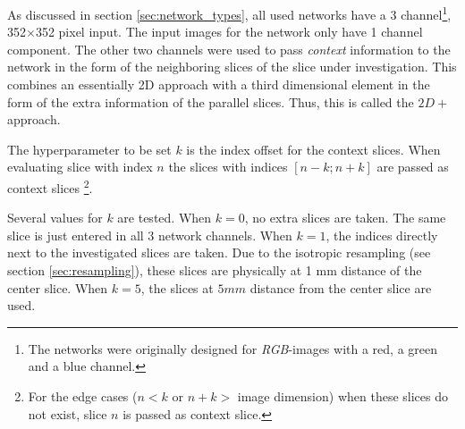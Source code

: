 As discussed in section \ref{sec:network_types}, all used networks have a 3 channel\footnote{The networks were originally designed for \textit{RGB}-images with a red, a green and a blue channel.}, 
352$\times$352 pixel input. 
The input images for the network only have 1 channel component. 
The other two channels were used to pass \textit{context} information to the network in the form of the neighboring slices of the slice under investigation.
This combines an essentially 2D approach with a third dimensional element in the form of the extra information of the parallel slices. Thus, this is called the $2D+$ approach.


The hyperparameter to be set $k$ is the index offset for the context slices.
When evaluating slice with index $n$ the slices with indices $\left[n-k; n+k\right]$ are passed as context slices
\footnote{For the edge cases ($n<k$ or $n+k>$ image dimension) when these slices do not exist, slice $n$ is passed as context slice.}.


Several values for $k$ are tested. When $k=0$, no extra slices are taken. The same slice is just entered in all 3 network channels. When $k=1$, the indices directly next to the investigated slices are taken.
Due to the isotropic resampling (see section \ref{sec:resampling}), these slices are physically at 1 mm distance of the center slice. When $k=5$, the slices at $5 mm$ distance from the center slice are used.